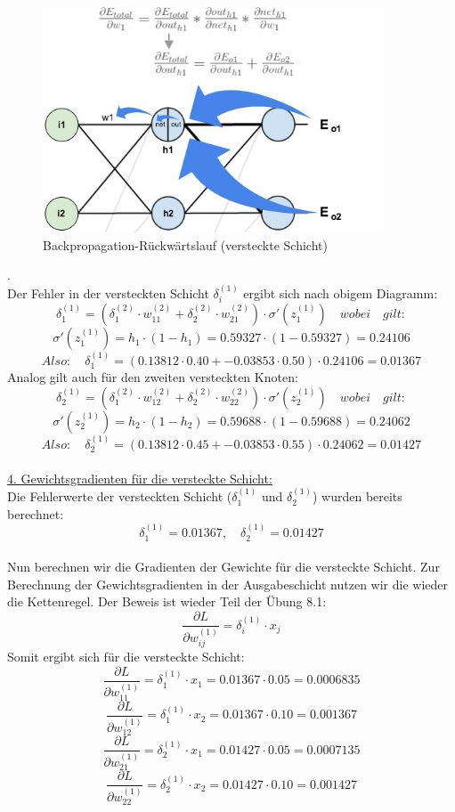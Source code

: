 \documentclass[12pt]{article}
\begin{document}
\begin{figure}[h]
  \centering
  \hspace*{+0.2cm}
  \includegraphics[width=0.9\textwidth]{Backpropagation-BP-02} 
  \caption{Backpropagation-Rückwärtslauf (versteckte Schicht)}
  \label{fig:BP-Rückw-02}
\end{figure}.\\[4.5cm]
%
Der Fehler in der versteckten Schicht $\delta^{(1)}_i $ ergibt sich nach obigem Diagramm:\\
\[
\delta^{(1)}_1 = (\delta^{(2)}_1 \cdot w^{(2)}_{11} + \delta^{(2)}_2 \cdot w^{(2)}_{21}) \cdot \sigma'(z^{(1)}_1) \quad wobei \quad gilt:
\]
\[
\sigma'(z^{(1)}_1) = h_1 \cdot (1 - h_1) = 0.59327 \cdot (1 - 0.59327) = 0.24106
\]
\[
Also: \quad \delta^{(1)}_1 = (0.13812 \cdot 0.40 + -0.03853 \cdot 0.50) \cdot 0.24106 = 0.01367
\]
Analog gilt auch für den zweiten versteckten Knoten:
\[
\delta^{(1)}_2 = (\delta^{(2)}_1 \cdot w^{(2)}_{12} + \delta^{(2)}_2 \cdot w^{(2)}_{22}) \cdot \sigma'(z^{(1)}_2) \quad wobei \quad gilt:
\]
\[
\sigma'(z^{(1)}_2) = h_2 \cdot (1 - h_2) = 0.59688 \cdot (1 - 0.59688) = 0.24062
\]
\[
Also: \quad \delta^{(1)}_2 = (0.13812 \cdot 0.45 + -0.03853 \cdot 0.55) \cdot 0.24062 = 0.01427
\]\\
%
\underline{4. Gewichtsgradienten für die versteckte Schicht:}\\[0.4cm]
%
Die Fehlerwerte der versteckten Schicht (\(\delta^{(1)}_1\) und \(\delta^{(1)}_2\)) wurden bereits berechnet:
\[
\delta^{(1)}_1 = 0.01367, \quad \delta^{(1)}_2 = 0.01427
\]
\\
Nun berechnen wir die Gradienten der Gewichte für die versteckte Schicht. Zur Berechnung der Gewichtsgradienten in der Ausgabeschicht nutzen wir die wieder die Kettenregel. Der Beweis ist wieder Teil der Übung 8.1: \\ 
\[ \frac{\partial L}{\partial w^{(1)}_{ij}} = \delta^{(1)}_i \cdot x_j \]
%
Somit ergibt sich für die versteckte Schicht:\\ 
\[
\frac{\partial L}{\partial w^{(1)}_{11}} = \delta^{(1)}_1 \cdot x_1 = 0.01367 \cdot 0.05 = 0.0006835
\]
\[
\frac{\partial L}{\partial w^{(1)}_{12}} = \delta^{(1)}_1 \cdot x_2 = 0.01367 \cdot 0.10 = 0.001367
\]
\[
\frac{\partial L}{\partial w^{(1)}_{21}} = \delta^{(1)}_2 \cdot x_1 = 0.01427 \cdot 0.05 = 0.0007135
\]
\[
\frac{\partial L}{\partial w^{(1)}_{22}} = \delta^{(1)}_2 \cdot x_2 = 0.01427 \cdot 0.10 = 0.001427
\]
\end{document}
